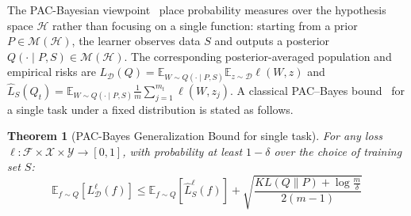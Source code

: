 \documentclass{article}
\theoremstyle{plain}
\newtheorem{theorem}{Theorem}[section]
\theoremstyle{definition}
\theoremstyle{remark}
\begin{document}
The PAC-Bayesian viewpoint~\cite{mcallesterPACBayesianModelAveraging1999,mcallesterPACBayesianStochasticModel2003} place probability measures over the hypothesis space $\mathcal{H}$ rather than focusing on a single function: starting from a prior $P\in\mathcal M(\mathcal H)$, the learner observes data $S$ and outputs a posterior $Q(\cdot\mid P,S)\in\mathcal M(\mathcal H)$. The corresponding posterior-averaged population and empirical risks  are $
L_{\mathcal D}(Q)
=
\mathbb E_{W \sim Q(\cdot \mid P,S)}\mathbb E_{z\sim\mathcal D}\ell(W,z)
$ and
$
\hat L_{S}(Q_t)
=
\mathbb E_{W \sim Q(\cdot \mid P,S)}\frac{1}{m}\sum_{j=1}^{m_t}\ell(W,z_{j}).
$
A classical PAC--Bayes bound~\cite{mcallesterPACBayesianStochasticModel2003} for a single task under a fixed distribution is stated as follows.
\begin{theorem}[PAC-Bayes Generalization Bound for single task]
\label{theorem:classical}
For any loss $\ell: \mathcal{F} \times \mathcal{X} \times \mathcal{Y} \to [0,1]$, with probability at least $1-\delta$ over the choice of training set $S$:
{%
\setlength{\belowdisplayskip}{3pt}
\setlength{\belowdisplayshortskip}{3pt}
    \[\mathbb{E}_{f \sim Q}[L_{\mathcal{D}}^{\ell}(f)] \leq \mathbb{E}_{f \sim Q}[\hat{L}_S^{\ell}(f)] + \sqrt{\frac{KL(Q\|P) + \log \frac{m}{\delta}}{2(m-1)}}\]
}
\end{theorem}
\end{document}
